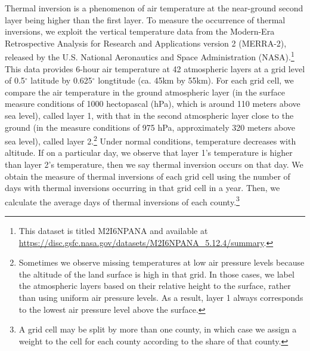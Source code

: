 \documentclass[12pt]{article}
\begin{document}
\label{sec:data_TI} Thermal inversion is a phenomenon of air temperature at
the near-ground second layer being higher than the first layer. To measure
the occurrence of thermal inversions, we exploit the vertical temperature
data from the Modern-Era Retrospective Analysis for Research and
Applications version 2 (MERRA-2), released by the U.S. National Aeronautics and Space Administration (NASA).\footnote{This dataset is titled M2I6NPANA and available at \url{https://disc.gsfc.nasa.gov/datasets/M2I6NPANA_5.12.4/summary}.} This
data provides 6-hour air temperature at 42 atmospheric layers at a grid
level of 0.5${{}^\circ}$ latitude
by 0.625${{}^\circ}$ longtitude
(ca. 45km by 55km). For each grid cell, we compare
the air temperature in the ground atmospheric layer (in the surface measure
conditions of 1000 hectopascal (hPa), which is around 110
meters above sea level), called layer 1, with that in the second atmospheric
layer close to the ground (in the measure conditions of 975 hPa, approximately
320 meters above sea level), called layer 2.\footnote{%
Sometimes we observe missing temperatures at low air pressure levels because
the altitude of the land surface is high in that grid. In those cases, we
label the atmospheric layers based on their relative height to the surface,
rather than using uniform air pressure levels. As a result, layer 1
always corresponds to the lowest air pressure level above the surface.}
Under normal conditions, temperature decreases with altitude. If on a
particular day, we observe that layer 1's temperature is higher than layer 2's
temperature, then we say thermal inversion occurs on that day. We obtain
the measure of thermal inversions of each grid cell using the number of days
with thermal inversions occurring in that grid cell in a year. Then, we calculate the average days of thermal inversions of each county.\footnote{A grid cell may be split by more than one county, in which case we assign a weight to the cell for each county according to the share of that county.} 
\end{document}

